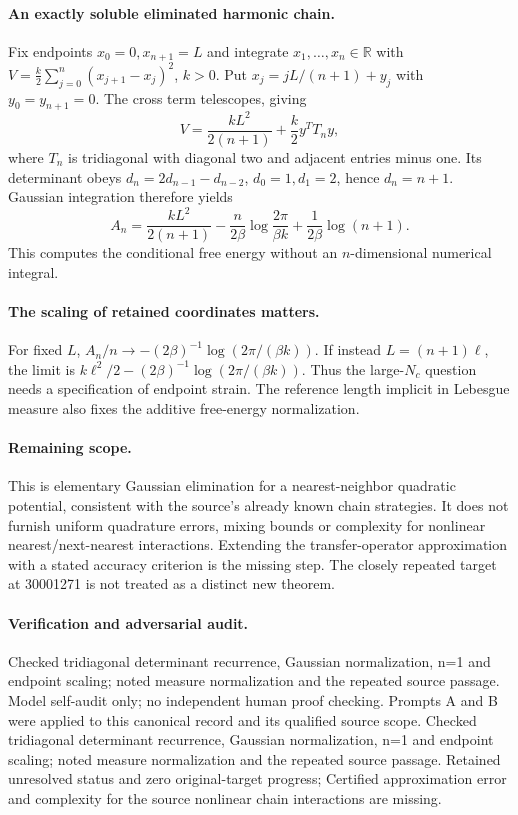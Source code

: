 \documentclass[11pt]{article}
\begin{document}
\paragraph{An exactly soluble eliminated harmonic chain.} Fix endpoints $x_0=0,x_{n+1}=L$ and integrate $x_1,\ldots,x_n\in\mathbb R$ with $V=\frac k2\sum_{j=0}^n(x_{j+1}-x_j)^2$, $k>0$. Put $x_j=jL/(n+1)+y_j$ with $y_0=y_{n+1}=0$. The cross term telescopes, giving
\[
 V=\frac{kL^2}{2(n+1)}+\frac k2 y^TT_ny,
\]
where $T_n$ is tridiagonal with diagonal two and adjacent entries minus one. Its determinant obeys $d_n=2d_{n-1}-d_{n-2}$, $d_0=1,d_1=2$, hence $d_n=n+1$. Gaussian integration therefore yields
\[
 A_n=\frac{kL^2}{2(n+1)}-\frac n{2\beta}\log\frac{2\pi}{\beta k}+\frac1{2\beta}\log(n+1).
\]
This computes the conditional free energy without an $n$-dimensional numerical integral.

\paragraph{The scaling of retained coordinates matters.} For fixed $L$, $A_n/n\to-(2\beta)^{-1}\log(2\pi/(\beta k))$. If instead $L=(n+1)\ell$, the limit is $k\ell^2/2-(2\beta)^{-1}\log(2\pi/(\beta k))$. Thus the large-$N_c$ question needs a specification of endpoint strain. The reference length implicit in Lebesgue measure also fixes the additive free-energy normalization.

\paragraph{Remaining scope.} This is elementary Gaussian elimination for a nearest-neighbor quadratic potential, consistent with the source's already known chain strategies. It does not furnish uniform quadrature errors, mixing bounds or complexity for nonlinear nearest/next-nearest interactions. Extending the transfer-operator approximation with a stated accuracy criterion is the missing step. The closely repeated target at 30001271 is not treated as a distinct new theorem.

\paragraph{Verification and adversarial audit.}
Checked tridiagonal determinant recurrence, Gaussian normalization, n=1 and endpoint scaling; noted measure normalization and the repeated source passage. Model self-audit only; no independent human proof checking. Prompts A and B were applied to this canonical record and its qualified source scope. Checked tridiagonal determinant recurrence, Gaussian normalization, n=1 and endpoint scaling; noted measure normalization and the repeated source passage. Retained unresolved status and zero original-target progress; Certified approximation error and complexity for the source nonlinear chain interactions are missing.
\end{document}
